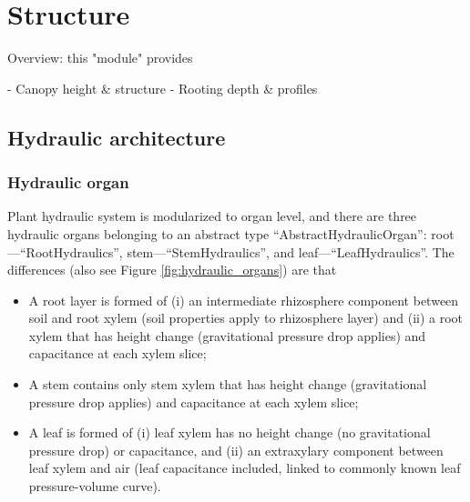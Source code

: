 \documentclass[twoside,10pt]{report}
\begin{document}
\chapter{Structure}

Overview: this "module" provides  

- Canopy height \& structure
- Rooting depth \& profiles

\newcommand{\GammaRef}{\gamma_\text{25}}
\newcommand{\KEx}{k_\text{ex}}
\newcommand{\KExMax}{k_\text{ex,max}}
\newcommand{\KRhizo}{k_\text{rhizo}}
\newcommand{\KRhizoMax}{k_\text{rhizo,max}}
\newcommand{\KX}{k_\text{x}}
\newcommand{\KXMax}{k_\text{x,max}}
\newcommand{\NO}{n_\text{o}}
\newcommand{\PApo}{P_\text{apo}}
\newcommand{\PEx}{P_\text{ex}}
\newcommand{\PHistory}{P_\text{history}}
\newcommand{\PsiLeaf}{\Psi_\text{leaf}}
\newcommand{\PsiO}{\Psi_\text{o}}
\newcommand{\PsiP}{\Psi_\text{p}}
\newcommand{\PsiRef}{\Psi_\text{25}}
\newcommand{\PsiRhizo}{\Psi_\text{rhizo}}
\newcommand{\PsiSat}{\Psi_\text{sat}}
\newcommand{\PsiSoil}{\Psi_\text{soil}}
\newcommand{\PsiTLP}{\Psi_\text{TLP}}
\newcommand{\PsiX}{\Psi_\text{x}}
\newcommand{\PTLP}{P_\text{TLP}}
\newcommand{\PX}{P_\text{x}}
\newcommand{\RWC}{\text{RWC}}
\newcommand{\RWCApo}{\text{RWC}_\text{apo}}
\newcommand{\RWCEff}{\text{RWC}_\text{eff}}
\newcommand{\RWCTLP}{\text{RWC}_\text{TLP}}
\newcommand{\ThetaR}{\Theta_\text{r}}
\newcommand{\ThetaS}{\Theta_\text{s}}
\newcommand{\VMAX}{V_\text{MAX}}


\section{Hydraulic architecture}

\subsection{Hydraulic organ}
\par Plant hydraulic system is modularized to organ level, and there are three hydraulic organs belonging to an abstract type ``AbstractHydraulicOrgan'': root---``RootHydraulics'', stem---``StemHydraulics'', and leaf---``LeafHydraulics''. The differences (also see Figure \ref{fig:hydraulic_organs}) are that
\begin{itemize}
    \item A root layer is formed of (i) an intermediate rhizosphere component between soil and root xylem (soil properties apply to rhizosphere layer) and (ii) a root xylem that has height change (gravitational pressure drop applies) and capacitance at each xylem slice;
    \item A stem contains only stem xylem that has height change (gravitational pressure drop applies) and capacitance at each xylem slice;
    \item A leaf is formed of (i) leaf xylem has no height change (no gravitational pressure drop) or capacitance, and (ii) an extraxylary component between leaf xylem and air (leaf capacitance included, linked to commonly known leaf pressure-volume curve).
\end{itemize}
\end{document}

